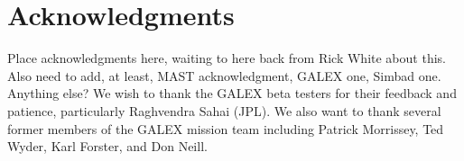 \documentclass[5p]{elsarticle}
\begin{document}
\section{Acknowledgments}
{\color{red}Place acknowledgments here, waiting to here back from Rick White about this.  Also need to add, at least, MAST acknowledgment, GALEX one, Simbad one.  Anything else?} We wish to thank the GALEX beta testers for their feedback and patience, particularly Raghvendra Sahai (JPL). We also want to thank several former members of the GALEX mission team including Patrick Morrissey, Ted Wyder, Karl Forster, and Don Neill.


\end{document}

